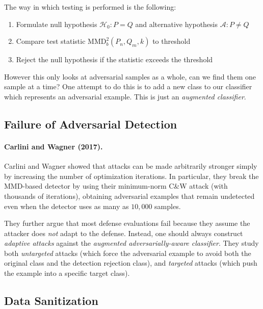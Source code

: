 \documentclass[11pt]{report}
\begin{document}
\medskip

\noindent The way in which testing is performed is the following:
\begin{enumerate}
    \item Formulate null hypothesis $\mathcal{H}_0: P = Q$ and alternative hypothesis $\mathcal{A}: P \neq Q$
    \item Compare test statistic $\mathrm{MMD}_b^2(P_n,Q_m,k)$ to threshold
    \item Reject the null hypothesis if the statistic exceeds the threshold
\end{enumerate}

\medskip

\noindent However this only looks at adversarial samples as a whole, can we find them one sample at a time? One attempt to do this is to add a new class to our classifier which represents an adversarial example. This is just an \emph{augmented classifier}.

\subsection*{Failure of Adversarial Detection}

\paragraph{Carlini and Wagner (2017).}
Carlini and Wagner showed that attacks can be made arbitrarily stronger simply by increasing the number of optimization iterations.  In particular, they break the MMD-based detector by using their minimum-norm C\&W attack (with thousands of iterations), obtaining adversarial examples that remain undetected even when the detector uses as many as $10{,}000$ samples.

\smallskip
\noindent
They further argue that most defense evaluations fail because they assume the attacker does \emph{not} adapt to the defense.  Instead, one should always construct \emph{adaptive attacks} against the \emph{augmented adversarially-aware classifier}.  They study both \emph{untargeted} attacks (which force the adversarial example to avoid both the original class and the detection rejection class), and \emph{targeted} attacks (which push the example into a specific target class).

\subsection{Data Sanitization}
\end{document}
